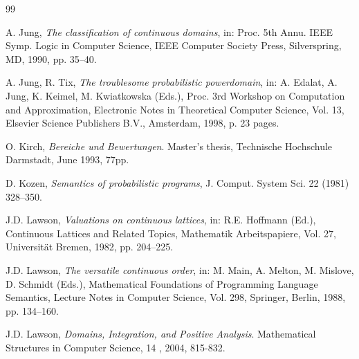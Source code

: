 \begin{thebibliography}{99}
\begin{LTR}
A. Jung, {\em The classification of continuous domains}, in: Proc. 5th Annu. IEEE Symp. Logic in Computer
Science, IEEE Computer Society Press, Silverspring, MD, 1990, pp. 35–40.


A. Jung, R. Tix, {\em The troublesome probabilistic powerdomain}, in: A. Edalat, A. Jung, K. Keimel, M.
Kwiatkowska (Eds.), Proc. 3rd Workshop on Computation and Approximation, Electronic Notes in
Theoretical Computer Science, Vol. 13, Elsevier Science Publishers B.V., Amsterdam, 1998, p. 23 pages.

%

O. Kirch, {\em Bereiche und Bewertungen}. Master’s thesis, Technische Hochschule Darmstadt, June 1993, 77pp.


D. Kozen, {\em Semantics of probabilistic programs}, J. Comput. System Sci. 22 (1981) 328–350.

J.D. Lawson, {\em Valuations on continuous lattices}, in: R.E. Hoffmann (Ed.), Continuous Lattices and Related
Topics, Mathematik Arbeitspapiere, Vol. 27, Universität Bremen, 1982, pp. 204–225.

J.D. Lawson, {\em The versatile continuous order}, in: M. Main, A. Melton, M. Mislove, D. Schmidt (Eds.),
Mathematical Foundations of Programming Language Semantics, Lecture Notes in Computer Science,
Vol. 298, Springer, Berlin, 1988, pp. 134–160.

J.D. Lawson, {\em Domains, Integration, and Positive Analysis}. Mathematical Structures in
Computer Science, 14 , 2004, 815-832.


\end{LTR}
\end{thebibliography}
